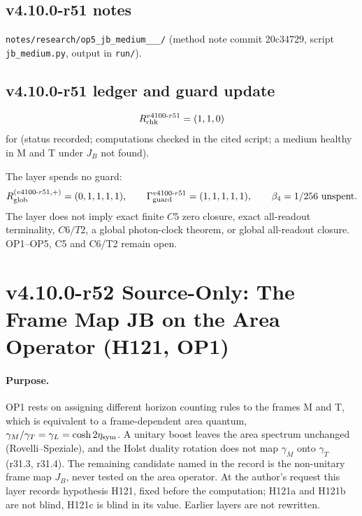 \subsection*{v4.10.0-r51 notes}
\label{subsec:v4100-r51-notes}

\texttt{notes/\allowbreak research/\allowbreak op5\_\allowbreak jb\_\allowbreak medium\_\_\_/} (method note commit 20c34729,
script \texttt{jb\_\allowbreak medium.py}, output in \texttt{run/}).

\subsection*{v4.10.0-r51 ledger and guard update}
\label{subsec:v4100-r51-ledger-guard}

\[
R_{\rm chk}^{v4100\text{-}r51}=(1,1,0)
\]
for (status recorded; computations checked in the cited script; a medium healthy in M and T under \(J_B\) not found).

The layer spends no guard:
\[
R_{\rm glob}^{(v4100\text{-}r51,+)}=(0,1,1,1,1),
\qquad
\Gamma_{\rm guard}^{v4100\text{-}r51}=(1,1,1,1,1),
\qquad
\beta_4=1/256\ \text{unspent}.
\]
The layer does not imply exact finite \(C5\) zero closure, exact all-readout terminality, \(C6/T2\), a global photon-clock theorem,
or global all-readout closure.  OP1--OP5, C5 and C6/T2 remain open.

\clearpage
\section*{v4.10.0-r52 Source-Only: The Frame Map JB on the Area Operator (H121, OP1)}
\label{sec:v4100-r52-jb-area}

\paragraph{Purpose.}
OP1 rests on assigning different horizon counting rules to the frames M and T, which is equivalent to a frame-dependent area quantum,
\(\gamma_M/\gamma_T=\gamma_L=\cosh2\eta_{\rm sym}\).  A unitary boost leaves the area spectrum unchanged (Rovelli--Speziale), and the Holst duality rotation does not
map \(\gamma_M\) onto \(\gamma_T\) (r31.3, r31.4).  The remaining candidate named in the record is the non-unitary frame map \(J_B\), never tested on the
area operator.  At the author's request this layer records hypothesis H121, fixed before the computation; H121a and H121b are not blind, H121c
is blind in its value.  Earlier layers are not rewritten.


